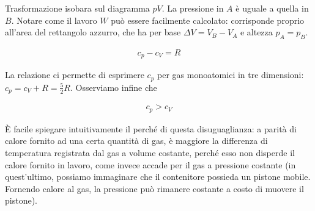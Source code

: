 \begin{marginfigure}
    \begin{center}
        \def\xmax{3}
        \def\ymax{2.5}
    \end{center}
    \caption{Trasformazione isobara sul diagramma $pV$. La
    pressione in $A$ è uguale a quella in $B$. Notare come
    il lavoro $W$ può essere facilmente calcolato: corrisponde
    proprio all'area del rettangolo azzurro, che ha per base
    $\Delta V = V_B - V_A$ e altezza $p_A = p_B$.}
\end{marginfigure}

\begin{tcolorbox}[colback = red!30, colframe = red!30!black, title = {Relazione di Mayer}]
\begin{align}
    c_p - c_V = R
\end{align}
\end{tcolorbox}

\noindent La relazione ci permette di esprimere $c_p$ per gas
monoatomici in tre dimensioni: $c_p = c_V + R = \frac52 R$.
Osserviamo infine che

\begin{align}
    c_p > c_V
\end{align}

\noindent È facile spiegare intuitivamente
il perché di questa disuguaglianza: a parità di calore fornito ad
una certa quantità di gas, è maggiore la differenza di temperatura
registrata dal gas a volume costante, perché esso non disperde il
calore fornito in lavoro, come invece accade per il gas a pressione
costante (in quest'ultimo, possiamo immaginare che il contenitore
possieda un pistone mobile. Fornendo calore al gas, la pressione
può rimanere costante a costo di muovere il pistone).

